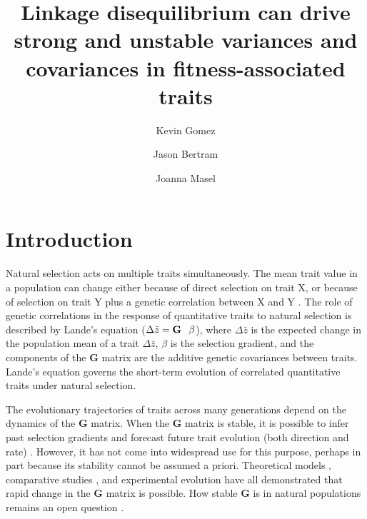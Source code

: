 \documentclass[9pt,twocolumn,twoside]{gsajnl}
\title{Linkage disequilibrium can drive strong and unstable variances and covariances in fitness-associated traits}
\author[$\ast$,1]{Kevin Gomez}
\author[$\dagger$]{Jason Bertram}
\author[$\dagger$]{Joanna Masel}
\affil[$\ast$]{Graduate Interdisciplinary Program in Applied Mathematics, University of Arizona, and}
\affil[$\dagger$]{Department of Evolution and Ecology, University of Arizona}
\newcommand{\G}{\textbf{G }}
\begin{document}
\maketitle
\thispagestyle{firststyle}
\marginmark
\firstpagefootnote
{}
\vspace{-11pt}%

\section{Introduction}

Natural selection acts on multiple traits simultaneously. The mean trait value in a population can change either because of direct selection on trait X, or because of selection on trait Y plus a genetic correlation between X and Y \citep{lande1979quantitative,lande1983measurement}. The role of genetic correlations in the response of quantitative traits to natural selection is described by Lande's equation ($\Delta \bar{z} = \G \hspace{.05in}\beta$), where $\Delta \bar{z}$ is the expected change in the population mean of a trait $\Delta \bar{z}$, $\beta$ is the selection gradient, and the components of the \G  matrix are the additive genetic covariances between traits. Lande's equation governs the short-term evolution of correlated quantitative traits under natural selection. 

The evolutionary trajectories of traits across many generations depend on the dynamics of the \G matrix. When the \G matrix is stable, it is possible to infer past selection gradients \cite{lande1979quantitative} and forecast future trait evolution (both direction and rate) \citep{via1985genotype,arnold1992constraints,bjorklund1996importance,Schluter1996,teplitsky2011quantitative,teplitsky2014assessing}. However, it has not come into widespread use for this purpose, perhaps in part because its stability cannot be assumed a priori. Theoretical models \citep{Turelli1988,Burger1994,Jones2003,Jones2004}, comparative studies \citep{bjorklund2013rapid,Waldmann2000}, and experimental evolution \citep{wilkinson1990resistance,Shaw1995,Phillips2001} have all demonstrated that rapid change in the \G matrix is possible. How stable \G is in natural populations remains an open question \citep{Steppan2002,Arnold2008}.
\end{document}
